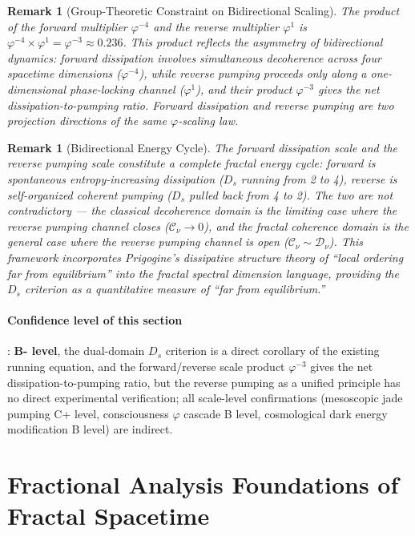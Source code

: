 \documentclass[12pt,a4paper,twocolumn]{article}
\renewcommand{\phi}{\varphi}
\newtheorem{remark}[theorem]{Remark}
\begin{document}
\begin{remark}[Group-Theoretic Constraint on Bidirectional Scaling]
The product of the forward multiplier $\phi^{-4}$ and the reverse multiplier $\phi^{1}$ is $\phi^{-4} \times \phi^{1} = \phi^{-3} \approx 0.236$. This product reflects the asymmetry of bidirectional dynamics: forward dissipation involves simultaneous decoherence across four spacetime dimensions ($\phi^{-4}$), while reverse pumping proceeds only along a one-dimensional phase-locking channel ($\phi^{1}$), and their product $\phi^{-3}$ gives the net dissipation-to-pumping ratio. Forward dissipation and reverse pumping are two projection directions of the same $\phi$-scaling law.
\end{remark}

\begin{remark}[Bidirectional Energy Cycle]
The forward dissipation scale and the reverse pumping scale constitute a complete fractal energy cycle: forward is spontaneous entropy-increasing dissipation ($D_s$ running from 2 to 4), reverse is self-organized coherent pumping ($D_s$ pulled back from 4 to 2). The two are not contradictory --- the classical decoherence domain is the limiting case where the reverse pumping channel closes ($\mathcal{C}_\nu \to 0$), and the fractal coherence domain is the general case where the reverse pumping channel is open ($\mathcal{C}_\nu \sim \mathcal{D}_\nu$). This framework incorporates Prigogine's dissipative structure theory of ``local ordering far from equilibrium'' into the fractal spectral dimension language, providing the $D_s$ criterion as a quantitative measure of ``far from equilibrium.''
\end{remark}

\paragraph{Confidence level of this section}: \textbf{B- level}, the dual-domain $D_s$ criterion is a direct corollary of the existing running equation, and the forward/reverse scale product $\phi^{-3}$ gives the net dissipation-to-pumping ratio, but the reverse pumping as a unified principle has no direct experimental verification; all scale-level confirmations (mesoscopic jade pumping C+ level, consciousness $\phi$ cascade B level, cosmological dark energy modification B level) are indirect.

\section{Fractional Analysis Foundations of Fractal Spacetime}
\label{sec:fractal_analysis}
\end{document}
